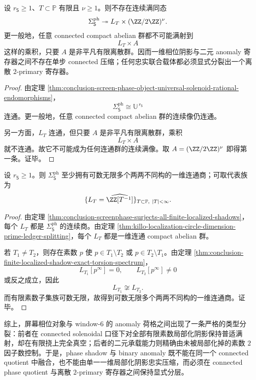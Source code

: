 \begin{theorem}\label{thm:conclusion-screenphase-connected-quotient-no-binary-anomaly-register}
设 \(r_{\mathsf S}\ge 1\)、\(T\subset\mathbb P\) 有限且 \(\nu\ge 1\)。则不存在连续满同态
\[
\Sigma_{\mathsf S}^{\mathrm{ph}}\twoheadrightarrow L_T\times (\ZZ/2\ZZ)^\nu.
\]
更一般地，任意 connected compact abelian 群都不可能满射到
\[
L_T\times A
\]
这样的乘积，只要 \(A\) 是非平凡有限离散群。因而一维相位阴影与二元 anomaly 寄存器之间不存在单步 connected 压缩；任何忠实联合载体都必须显式分裂出一个离散 \(2\)-primary 寄存器。
\end{theorem}
\begin{proof}
由定理 \ref{thm:conclusion-screen-phase-object-universal-solenoid-rational-endomorphisms}，
\[
\Sigma_{\mathsf S}^{\mathrm{ph}}\cong \mathbb U^{\,r_{\mathsf S}}
\]
连通。更一般地，任意 connected compact abelian 群的连续像仍连通。

另一方面，\(L_T\) 连通，但只要 \(A\) 是非平凡有限离散群，乘积
\[
L_T\times A
\]
就不连通。故它不可能成为任何连通群的连续满像。取 \(A=(\ZZ/2\ZZ)^\nu\) 即得第一条。证毕。
\end{proof}

\begin{corollary}[每个非平凡屏幕相位对象都拥有可数无限多个两两不同构的一维连通阴影]\label{cor:conclusion-screenphase-countably-many-nonisomorphic-1d-connected-shadows}
设 \(r_{\mathsf S}\ge 1\)。则 \(\Sigma_{\mathsf S}^{\mathrm{ph}}\) 至少拥有可数无限多个两两不同构的一维连通商；可取代表族为
\[
\{L_T=\widehat{\ZZ[T^{-1}]}\}_{T\subset\mathbb P,\ |T|<\infty}.
\]
\end{corollary}
\begin{proof}
由定理 \ref{thm:conclusion-screenphase-surjects-all-finite-localized-shadows}，每个 \(L_T\) 都是 \(\Sigma_{\mathsf S}^{\mathrm{ph}}\) 的连续商。由定理 \ref{thm:killo-localization-circle-dimension-prime-ledger-splitting}，每个 \(L_T\) 都是一维连通 compact abelian 群。

若 \(T_1\neq T_2\)，则存在素数 \(p\) 使 \(p\in T_1\setminus T_2\) 或 \(p\in T_2\setminus T_1\)。由定理 \ref{thm:conclusion-finite-localized-shadow-exact-torsion-spectrum}，
\[
L_{T_1}[p^\infty]=0,\qquad L_{T_2}[p^\infty]\neq 0
\]
或反之成立，因此
\[
L_{T_1}\not\cong L_{T_2}.
\]
而有限素数子集族可数无限，故得到可数无限多个两两不同构的一维连通商。证毕。
\end{proof}

综上，屏幕相位对象与 window-\(6\) 的 anomaly 荷格之间出现了一条严格的类型分裂：前者在 connected solenoidal 口径下对全部有限素数局部化阴影保持普适满射，却在有限挠上完全真空；后者的二元承载能力则精确由未被局部化掉的素数 \(2\) 因子数控制。于是，phase shadow 与 binary anomaly 既不能在同一个 connected quotient 中融合，也不能由单一一维局部化阴影忠实压缩，而必须在 connected phase quotient 与离散 \(2\)-primary 寄存器之间保持显式分层。

\endinput
